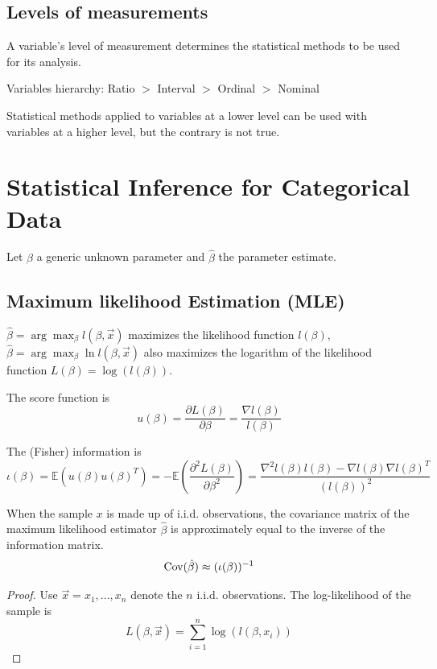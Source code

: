 \documentclass[11pt]{elegantbook}
\begin{document}
\subsection*{Levels of measurements}
A variable's level of measurement determines the statistical methods to be used for its analysis.
\begin{center}
    Variables hierarchy: Ratio $>$ Interval $>$ Ordinal $>$ Nominal
\end{center}
Statistical methods applied to variables at a lower level can be used with variables at a higher level, but the contrary is not true.

\section{Statistical Inference for Categorical Data}
Let $\beta$ a generic unknown parameter and $\hat{\beta}$ the parameter estimate.
\subsection{Maximum likelihood Estimation (MLE)}
$\hat{\beta}=\arg\max_{\beta} l(\beta,\vec{x})$ maximizes the likelihood function $l(\beta)$, $\hat{\beta}=\arg\max_{\beta}\ln l(\beta,\vec{x})$ also maximizes the logarithm of the likelihood function $L(\beta) = \log(l(\beta))$.

\begin{definition}
    The score function is $$u(\beta)=\frac{\partial L(\beta)}{\partial \beta}=\frac{\nabla l(\beta)}{l(\beta)}$$
\end{definition}

\begin{definition}
    The (Fisher) information is $$\iota(\beta)=\mathbb{E}\left(u(\beta)u(\beta)^T\right)=-\mathbb{E}\left(\frac{\partial^2 L(\beta)}{\partial \beta^2}\right)=\frac{\nabla^2l(\beta) l(\beta)-\nabla l(\beta)\nabla l(\beta)^T}{(l(\beta))^2}$$
\end{definition}

\begin{proposition}
    When the sample $x$ is made up of i.i.d. observations, the covariance matrix of the maximum likelihood estimator $\hat{\beta}$ is approximately equal to the inverse of the information matrix. $$\textnormal{Cov}(\hat{\beta})\approx(\iota(\beta))^{-1}$$
\end{proposition}
\begin{proof}
    Use $\vec{x}=x_1,...,x_n$ denote the $n$ i.i.d. observations. The log-likelihood of the sample is $$L(\beta,\vec{x})=\sum_{i=1}^n\log(l(\beta,x_i))$$
\end{proof}
\end{document}
